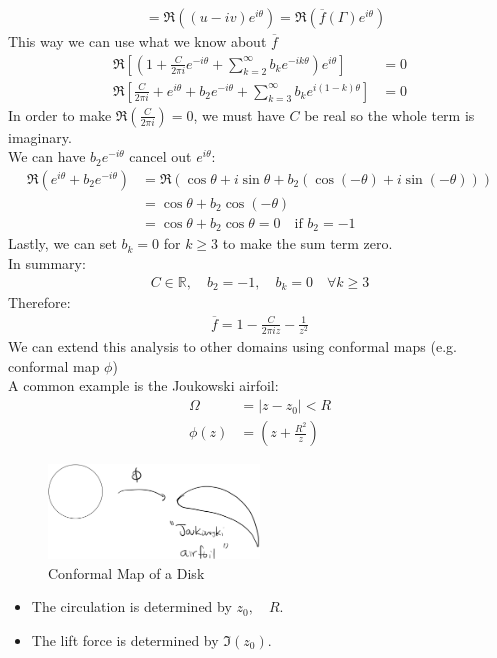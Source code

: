 \begin{example}
\begin{align*}
          & = \Re((u - iv)e^{i\theta}) = \Re(\overline{f}(\Gamma)e^{i\theta})
    \end{align*}
    This way we can use what we know about $\overline{f}$
    \begin{align*}
        \Re\left[(1 + \frac{C}{2\pi i}e^{-i\theta} + \sum_{k = 2}^{\infty}b_k e^{-ik\theta})e^{i\theta}\right]       & = 0 \\
        \Re\left[\frac{C}{2\pi i} + e^{i\theta} + b_2e^{-i\theta} + \sum_{k = 3}^{\infty}b_k e^{i(1-k)\theta}\right] & = 0
    \end{align*}
    In order to make $\Re(\frac{C}{2\pi i}) = 0$, we must have $C$ be real so the whole term is imaginary.\\
    We can have $b_2e^{-i\theta}$ cancel out $e^{i\theta}$:
    \begin{align}
        \Re(e^{i\theta} + b_2e^{-i\theta}) & = \Re(\cos\theta + i\sin\theta + b_2(\cos(-\theta) + i\sin(-\theta))) \\
                                           & = \cos\theta + b_2\cos(-\theta)                                       \\
                                           & = \cos\theta + b_2\cos\theta = 0 \quad \text{if } b_2 = -1
    \end{align}
    Lastly, we can set $b_k = 0$ for $k \geq 3$ to make the sum term zero.\\
    In summary:
    \begin{align*}
        C\in \mathbb{R}, \quad b_2 = -1, \quad b_k = 0 \quad \forall k \geq 3
    \end{align*}
    Therefore:
    \begin{align*}
        \overline{f} = 1 - \frac{C}{2\pi i z} - \frac{1}{z^2}
    \end{align*}
    We can extend this analysis to other domains using conformal maps (e.g. conformal map $\phi$)\\ A common example is the Joukowski airfoil:
    \begin{align*}
        \Omega  & = {|z - z_0| < R}     \\
        \phi(z) & = (z + \frac{R^2}{z})
    \end{align*}

    \begin{figure}[H]
        \centering
        \includegraphics[width=0.5\textwidth]{LECTURE_19/airfoil.png}
        \caption{Conformal Map of a Disk}
    \end{figure}
    \begin{itemize}
        \item The circulation is determined by $z_0, \quad R$.
        \item The lift force is determined by $\Im(z_0)$.
    \end{itemize}
\end{example}
